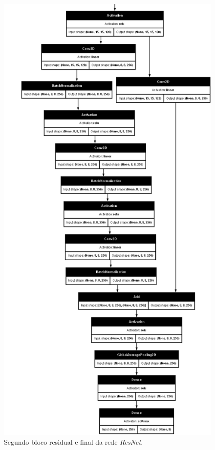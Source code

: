 \documentclass[final,5p]{elsarticle}
\numberwithin{equation}{section}
\begin{document}
\begin{figure}[H]
    \includegraphics[width=0.95\columnwidth]{ResNet_model_lower.png}
    \caption{Segundo bloco residual e final da rede \emph{ResNet}.}\label{fig:ModeloCNNlower}
\end{figure}
\end{document}
